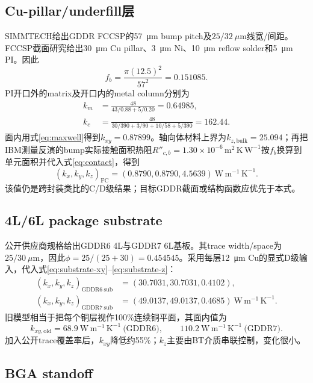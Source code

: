 \documentclass[UTF8,zihao=-4]{ctexart}
\newcommand{\kxyz}{(k_x,k_y,k_z)}
\newcommand{\unitk}{\mathrm{W\,m^{-1}\,K^{-1}}}
\newcommand{\unitr}{\mathrm{m^2\,K\,W^{-1}}}
\begin{document}
\subsection{Cu-pillar/underfill层}

SIMMTECH给出GDDR FCCSP的\SI{57}{\micro\metre} bump pitch及$25/32~\mu\mathrm{m}$线宽/间距\cite{SimmtechGDDR}。FCCSP截面研究给出\SI{30}{\micro\metre} Cu pillar、\SI{3}{\micro\metre} Ni、\SI{10}{\micro\metre} reflow solder和\SI{5}{\micro\metre} PI\cite{LiEtAl2025}。因此
\begin{equation}
  f_b=\frac{\pi(12.5)^2}{57^2}=0.151085.
\end{equation}
PI开口外的matrix及开口内的metal column分别为
\begin{align}
  k_m&=\frac{48}{43/0.88+5/0.20}=0.64985,\\
  k_c&=\frac{48}{30/390+3/90+10/58+5/390}=162.44.
\end{align}
面内用式\eqref{eq:maxwell}得到$k_{xy}=0.87899$。轴向体材料上界为$k_{z,\mathrm{bulk}}=25.094$；再把IBM测量反演的bump实际接触面积热阻$R''_{c,b}=1.30\times10^{-6}\,\unitr$按$f_b$换算到单元面积并代入式\eqref{eq:contact}，得到
\begin{equation}
  \kxyz_{\mathrm{FC}}=(0.8790,0.8790,4.5639)~\unitk.
\end{equation}
该值仍是跨封装类比的C/D级结果；目标GDDR截面或结构函数应优先于本式。

\subsection{4L/6L package substrate}

公开供应商规格给出GDDR6 4L与GDDR7 6L基板\cite{SimmtechGDDR}。其trace width/space为$25/30~\mu\mathrm{m}$，因此$\phi=25/(25+30)=0.454545$。采用每层\SI{12}{\micro\metre} Cu的显式D级输入，代入式\eqref{eq:substrate-xy}--\eqref{eq:substrate-z}：
\begin{align}
  \kxyz_{\mathrm{GDDR6\ sub}}&=(30.7031,30.7031,0.4102),\\
  \kxyz_{\mathrm{GDDR7\ sub}}&=(49.0137,49.0137,0.4685)~\unitk.
\end{align}
旧模型相当于把每个铜层视作100\%连续铜平面，其面内值为
\begin{equation*}
  k_{xy,\mathrm{old}}=68.9~\unitk\ \text{(GDDR6)},\qquad
  110.2~\unitk\ \text{(GDDR7)}.
\end{equation*}
加入公开trace覆盖率后，$k_{xy}$降低约55\%；$k_z$主要由BT介质串联控制，变化很小。

\subsection{BGA standoff}
\end{document}
